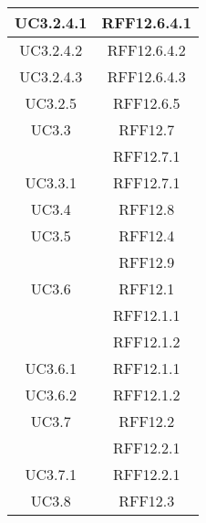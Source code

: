 \begin{longtable}{|c|c|}
\midrule
UC3.2.4.1
& RFF12.6.4.1\\

\midrule
UC3.2.4.2
& RFF12.6.4.2\\

\midrule
UC3.2.4.3
& RFF12.6.4.3\\

\midrule
UC3.2.5
& RFF12.6.5\\

\midrule
UC3.3
& RFF12.7\\
& RFF12.7.1\\

\midrule
UC3.3.1
& RFF12.7.1\\

\midrule
UC3.4
& RFF12.8\\

\midrule
UC3.5
& RFF12.4\\
& RFF12.9\\

\midrule
UC3.6
& RFF12.1\\
& RFF12.1.1\\
& RFF12.1.2\\

\midrule
UC3.6.1
& RFF12.1.1\\

\midrule
UC3.6.2
& RFF12.1.2\\

\midrule
UC3.7
& RFF12.2\\
& RFF12.2.1\\

\midrule
UC3.7.1
& RFF12.2.1\\

\midrule
UC3.8
& RFF12.3\\

\end{longtable}
